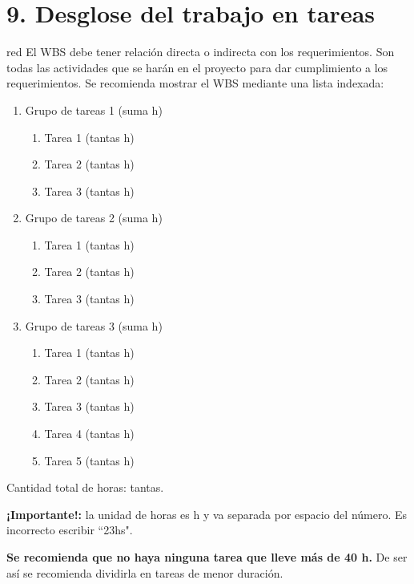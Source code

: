 \documentclass[
11pt, %
codirector, %
]{charter}
\begin{document}
\section{9. Desglose del trabajo en tareas}
\label{sec:wbs}

\begin{consigna}{red}
	El WBS debe tener relación directa o indirecta con los requerimientos.  Son todas las actividades que se harán en el proyecto para dar cumplimiento a los requerimientos. Se recomienda mostrar el WBS mediante una lista indexada:

	\begin{enumerate}
		\item Grupo de tareas 1 (suma h)
		      \begin{enumerate}
			      \item Tarea 1 (tantas h)
			      \item Tarea 2 (tantas h)
			      \item Tarea 3 (tantas h)
		      \end{enumerate}
		\item Grupo de tareas 2 (suma h)
		      \begin{enumerate}
			      \item Tarea 1 (tantas h)
			      \item Tarea 2 (tantas h)
			      \item Tarea 3 (tantas h)
		      \end{enumerate}
		\item Grupo de tareas 3 (suma h)
		      \begin{enumerate}
			      \item Tarea 1 (tantas h)
			      \item Tarea 2 (tantas h)
			      \item Tarea 3 (tantas h)
			      \item Tarea 4 (tantas h)
			      \item Tarea 5 (tantas h)
		      \end{enumerate}
	\end{enumerate}

	Cantidad total de horas: tantas.

	\textbf{¡Importante!:} la unidad de horas es h y va separada por espacio del número. Es incorrecto escribir ``23hs".

	\textbf{Se recomienda que no haya ninguna tarea que lleve más de 40 h.} De ser así se recomienda dividirla en tareas de menor duración.

\end{consigna}
\end{document}
